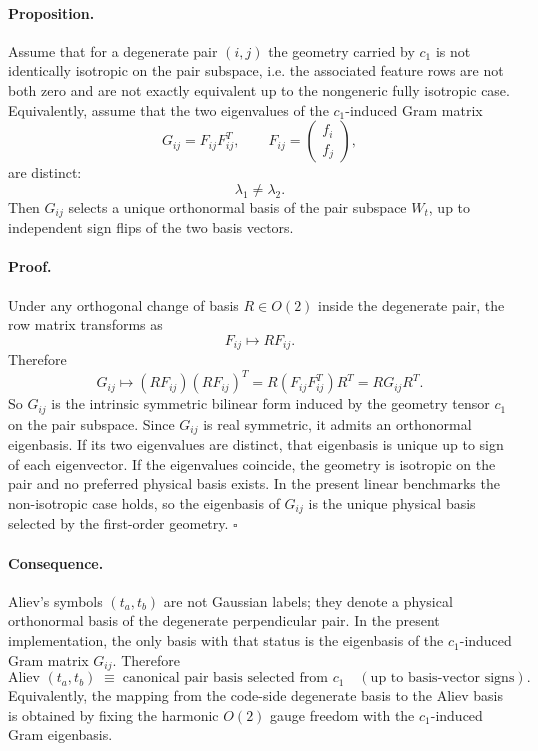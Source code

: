 \documentclass[11pt]{article}
\begin{document}
\paragraph{Proposition.}
Assume that for a degenerate pair $(i,j)$ the geometry carried by $c_1$ is not
identically isotropic on the pair subspace, i.e. the associated feature rows
are not both zero and are not exactly equivalent up to the nongeneric fully
isotropic case. Equivalently, assume that the two eigenvalues of the
$c_1$-induced Gram matrix
\[
G_{ij}=F_{ij}F_{ij}^T,
\qquad
F_{ij}=
\begin{pmatrix}
f_i\\
f_j
\end{pmatrix},
\]
are distinct:
\[
\lambda_1 \neq \lambda_2.
\]
Then $G_{ij}$ selects a unique orthonormal basis of the pair subspace $W_t$, up to
independent sign flips of the two basis vectors.

\paragraph{Proof.}
Under any orthogonal change of basis $R\in O(2)$ inside the degenerate pair,
the row matrix transforms as
\[
F_{ij}\mapsto RF_{ij}.
\]
Therefore
\[
G_{ij}\mapsto (RF_{ij})(RF_{ij})^T = R(F_{ij}F_{ij}^T)R^T = RG_{ij}R^T.
\]
So $G_{ij}$ is the intrinsic symmetric bilinear form induced by the geometry
tensor $c_1$ on the pair subspace. Since $G_{ij}$ is real symmetric, it admits
an orthonormal eigenbasis. If its two eigenvalues are distinct, that eigenbasis
is unique up to sign of each eigenvector. If the eigenvalues coincide, the
geometry is isotropic on the pair and no preferred physical basis exists. In
the present linear benchmarks the non-isotropic case holds, so the eigenbasis
of $G_{ij}$ is the unique physical basis selected by the first-order geometry.
\hfill$\square$

\paragraph{Consequence.}
Aliev's symbols $(t_a,t_b)$ are not Gaussian labels; they denote a physical
orthonormal basis of the degenerate perpendicular pair. In the present
implementation, the only basis with that status is the eigenbasis of the
$c_1$-induced Gram matrix $G_{ij}$. Therefore
\[
\text{Aliev }(t_a,t_b)
\;\equiv\;
\text{canonical pair basis selected from }c_1
\quad
(\text{up to basis-vector signs}).
\]
Equivalently, the mapping from the code-side degenerate basis to the Aliev
basis is obtained by fixing the harmonic $O(2)$ gauge freedom with the
$c_1$-induced Gram eigenbasis.
\end{document}
